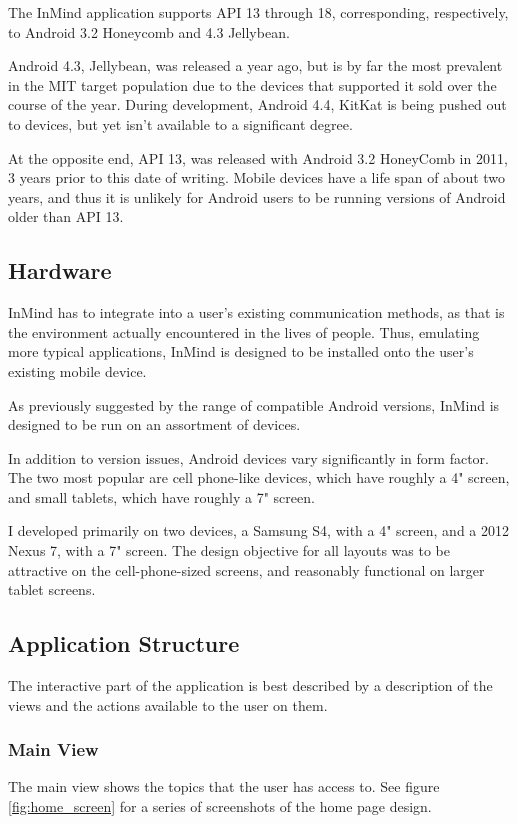    The InMind application supports API 13 through 18, 
    corresponding, respectively, to Android 3.2 Honeycomb and 4.3 Jellybean.

    Android 4.3, Jellybean, was released a year ago, but is by far
    the most prevalent in the MIT target population due to the devices
    that supported it sold over the course of the year.
    During development, Android 4.4, KitKat is being pushed out to devices,
    but yet isn't available to a significant degree.

    At the opposite end, API 13, was released with Android 3.2 HoneyComb
    in 2011, 3 years prior to this date of writing.
    Mobile devices have a life span of about two years,
    and thus it is unlikely for Android users to be
    running versions of Android older than API 13.

    \subsection{Hardware}
    InMind has to integrate into a user's existing communication methods,
    as that is the environment actually encountered in the lives of people.
    Thus, emulating more typical applications,
    InMind is designed to be installed onto the user's existing mobile device.

    As previously suggested by the range of compatible Android versions,
    InMind is designed to be run on an assortment of devices.
    
    In addition to version issues, Android devices vary significantly in form factor.
    The two most popular are cell phone-like devices, which have roughly a 4" screen,
    and small tablets, which have roughly a 7" screen.

    I developed primarily on two devices, a Samsung S4, with a 4" screen,
    and a 2012 Nexus 7, with a 7" screen.
    The design objective for all layouts was to be attractive on the cell-phone-sized screens,
    and reasonably functional on larger tablet screens.

    \subsection{Application Structure}
    The interactive part of the application is best described by a description of the views
    and the actions available to the user on them.
      \subsubsection{Main View}
      The main view shows the topics that the user has access to.
      See figure \ref{fig:home_screen} for a series of screenshots of the home page design.

